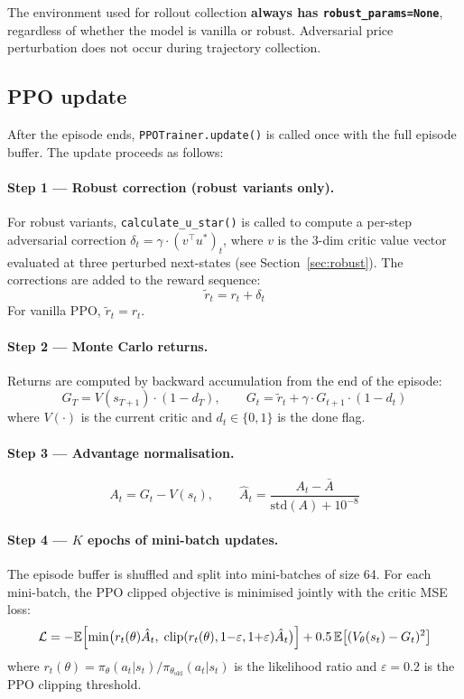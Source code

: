 \documentclass[11pt,a4paper]{article}
\begin{document}
The environment used for rollout collection \textbf{always has \texttt{robust\_params=None}}, regardless of whether the model is vanilla or robust. Adversarial price perturbation does not occur during trajectory collection.

\subsection{PPO update}

After the episode ends, \texttt{PPOTrainer.update()} is called once with the full episode buffer. The update proceeds as follows:

\paragraph{Step 1 --- Robust correction (robust variants only).}
For robust variants, \texttt{calculate\_u\_star()} is called to compute a per-step adversarial correction $\delta_t = \gamma \cdot (v^\top u^*)_t$, where $v$ is the 3-dim critic value vector evaluated at three perturbed next-states (see Section~\ref{sec:robust}). The corrections are added to the reward sequence:
\[
  \tilde{r}_t = r_t + \delta_t
\]
For vanilla PPO, $\tilde{r}_t = r_t$.

\paragraph{Step 2 --- Monte Carlo returns.}
Returns are computed by backward accumulation from the end of the episode:
\[
  G_T = V(s_{T+1}) \cdot (1 - d_T), \qquad
  G_t = \tilde{r}_t + \gamma \cdot G_{t+1} \cdot (1 - d_t)
\]
where $V(\cdot)$ is the current critic and $d_t \in \{0,1\}$ is the done flag.

\paragraph{Step 3 --- Advantage normalisation.}
\[
  A_t = G_t - V(s_t), \qquad
  \hat{A}_t = \frac{A_t - \bar{A}}{\text{std}(A) + 10^{-8}}
\]

\paragraph{Step 4 --- $K$ epochs of mini-batch updates.}
The episode buffer is shuffled and split into mini-batches of size 64. For each mini-batch, the PPO clipped objective is minimised jointly with the critic MSE loss:
\[
  \mathcal{L} = -\mathbb{E}\Bigl[\min\bigl(r_t(\theta)\hat{A}_t,\;\text{clip}(r_t(\theta), 1{-}\varepsilon, 1{+}\varepsilon)\hat{A}_t\bigr)\Bigr]
              + 0.5\,\mathbb{E}\bigl[(V_\theta(s_t) - G_t)^2\bigr]
\]
where $r_t(\theta) = \pi_\theta(a_t|s_t)/\pi_{\theta_\text{old}}(a_t|s_t)$ is the likelihood ratio and $\varepsilon = 0.2$ is the PPO clipping threshold.
\end{document}
